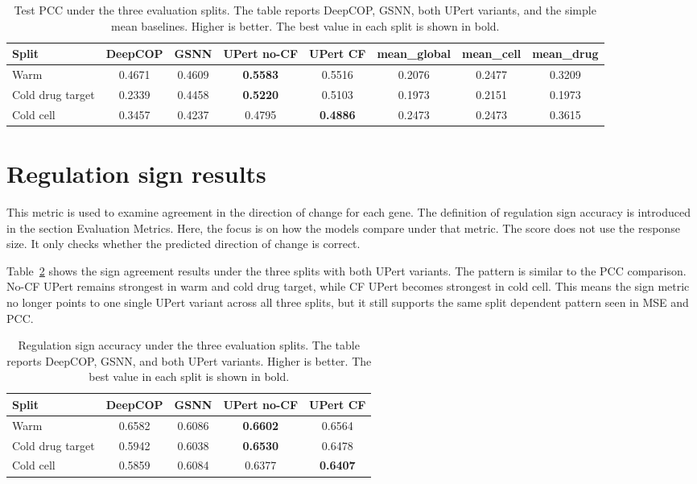 \begin{table}[htbp]
\centering
\caption[Test PCC Across Splits]{Test PCC under the three evaluation splits. The table reports DeepCOP, GSNN, both UPert variants, and the simple mean baselines. Higher is better. The best value in each split is shown in bold.}
\label{tab:pcc_results}
\begin{tabular}{lccccccc}
\hline
Split & DeepCOP & GSNN & UPert no-CF & UPert CF & mean\_global & mean\_cell & mean\_drug \\
\hline
Warm & 0.4671 & 0.4609 & \textbf{0.5583} & 0.5516 & 0.2076 & 0.2477 & 0.3209 \\
Cold drug target & 0.2339 & 0.4458 & \textbf{0.5220} & 0.5103 & 0.1973 & 0.2151 & 0.1973 \\
Cold cell & 0.3457 & 0.4237 & 0.4795 & \textbf{0.4886} & 0.2473 & 0.2473 & 0.3615 \\
\hline
\end{tabular}
\end{table}

\section{Regulation sign results}
\noindent This metric is used to examine agreement in the direction of change for each gene. The definition of regulation sign accuracy is introduced in the section Evaluation Metrics. Here, the focus is on how the models compare under that metric. The score does not use the response size. It only checks whether the predicted direction of change is correct.

\noindent Table~\ref{tab:sign_accuracy_results} shows the sign agreement results under the three splits with both UPert variants. The pattern is similar to the PCC comparison. No-CF UPert remains strongest in warm and cold drug target, while CF UPert becomes strongest in cold cell. This means the sign metric no longer points to one single UPert variant across all three splits, but it still supports the same split dependent pattern seen in MSE and PCC.

\begin{table}[htbp]
\centering
\caption[Sign Accuracy Across Splits]{Regulation sign accuracy under the three evaluation splits. The table reports DeepCOP, GSNN, and both UPert variants. Higher is better. The best value in each split is shown in bold.}
\label{tab:sign_accuracy_results}
\begin{tabular}{lcccc}
\hline
Split & DeepCOP & GSNN & UPert no-CF & UPert CF \\
\hline
Warm & 0.6582 & 0.6086 & \textbf{0.6602} & 0.6564 \\
Cold drug target & 0.5942 & 0.6038 & \textbf{0.6530} & 0.6478 \\
Cold cell & 0.5859 & 0.6084 & 0.6377 & \textbf{0.6407} \\
\hline
\end{tabular}
\end{table}

